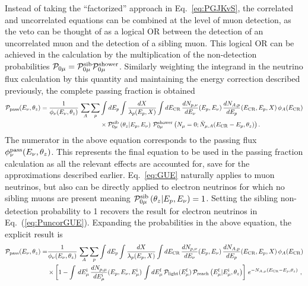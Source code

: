 Instead of taking the ``factorized'' approach in Eq.~\ref{eq:PGJKvS}, the correlated and uncorrelated equations can be combined at the level of muon detection, as the veto can be thought of as a logical OR between the detection of an uncorrelated muon and the detection of a sibling muon.
This logical OR can be achieved in the calculation by the multiplication of the non-detection probabilities ${\cal P}_{0\mu} = {\cal P}_{0\mu}^{\rm sib} {\cal P}_{0\mu}^{\rm shower}$.
Similarly weighting the integrand in the neutrino flux calculation by this quantity and maintaining the energy correction described previously, the complete passing fraction is obtained
\begin{align}
\label{eq:GUE}
{\cal P}_{\rm pass}(E_\nu, \theta_z) = \frac{1}{\phi_\nu(E_\nu, \theta_z)} \, \sum_A \sum_{p} & \int dE_p  \int \frac{dX}{\lambda_p(E_p, X)} \int dE_{\rm CR} \, \frac{dN_{p, \nu}}{dE_\nu}(E_p, E_\nu) \, \frac{dN_{A, p}}{dE_p}(E_{\rm CR}, E_p, X) \, \phi_A(E_{\rm CR}) \nonumber \\
& \times {\cal P}_{0\mu}^{\rm sib} \left(\theta_z|E_p, E_\nu \right) \, {\cal P}_{0\mu}^{\rm shower}\left(N_\mu=0;  \bar N_{\mu, A}(E_{\rm CR} - E_p, \theta_z) \right).
\end{align}
The numerator in the above equation corresponds to the passing flux $\phi_\nu^{\rm pass}(E_\nu, \theta_z)$.
This represents the final equation to be used in the passing fraction calculation as all the relevant effects are accounted for, save for the approximations described earlier.
Eq.~\ref{eq:GUE} naturally applies to muon neutrinos, but also can be directly applied to electron neutrinos for which no sibling muons are present meaning ${\cal P}_{0\mu}^{\rm sib} \left(\theta_z | E_p, E_\nu \right) = 1$.
Setting the sibling non-detection probability to 1 recovers the result for electron neutrinos in Eq.~(\ref{eq:PuncorGUE}).
Expanding the probabilities in the above equation, the explicit result is
\begin{align}
\label{eq:GUEexplicit}
{\cal P}_{\rm pass} (E_\nu, \theta_z) = & \frac{1}{\phi_\nu(E_\nu, \theta_z)} \, \sum_A \sum_{p} \int dE_p \int \frac{dX}{\lambda_p(E_p, X)} \int dE_{\rm CR} \, \frac{dN_{p, \nu}}{dE_\nu}(E_p, E_\nu) \, \frac{dN_{A, p}}{dE_p}(E_{\rm CR}, E_p, X) \, \phi_A(E_{\rm CR}) \nonumber \\
& \times \left[ 1 - \int \, dE_{\mu}^{\rm i} \, \frac{dN_{p, \mu}}{dE_{\mu}^{\rm i}}(E_p, E_\nu, E_{\mu}^{\rm i}) \, \int dE_{\mu}^{\rm f} \, {\cal P}_{\rm light}(E_{\mu}^{\rm f})  \, {\cal P}_{\rm reach}\left(E_{\mu}^{\rm f} | E_{\mu}^{\rm i}, \theta_z\right) \right] \, e^{-N_{A, \mu}(E_{\rm CR} - E_p, \theta_z)}  ~,
\end{align}

